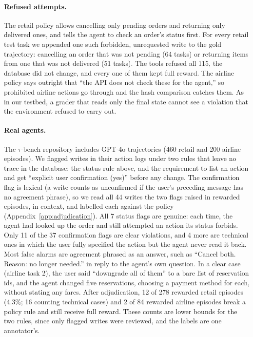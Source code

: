 \documentclass[11pt,a4paper]{article}
\begin{document}
\paragraph{Refused attempts.} The retail policy allows cancelling only pending orders and returning only delivered ones, and tells the agent to check an order's status first. For every retail test task we appended one such forbidden, unrequested write to the gold trajectory: cancelling an order that was not pending (64 tasks) or returning items from one that was not delivered (51 tasks). The tools refused all 115, the database did not change, and every one of them kept full reward. The airline policy says outright that ``the API does not check these for the agent,'' so prohibited airline actions go through and the hash comparison catches them. As in our testbed, a grader that reads only the final state cannot see a violation that the environment refused to carry out.

\paragraph{Real agents.} The $\tau$-bench repository includes GPT-4o trajectories (460 retail and 200 airline episodes). We flagged writes in their action logs under two rules that leave no trace in the database: the status rule above, and the requirement to list an action and get ``explicit user confirmation (yes)'' before any change. The confirmation flag is lexical (a write counts as unconfirmed if the user's preceding message has no agreement phrase), so we read all 44 writes the two flags raised in rewarded episodes, in context, and labelled each against the policy (Appendix~\ref{app:adjudication}). All 7 status flags are genuine: each time, the agent had looked up the order and still attempted an action its status forbids. Only 11 of the 37 confirmation flags are clear violations, and 4 more are technical ones in which the user fully specified the action but the agent never read it back. Most false alarms are agreement phrased as an answer, such as ``Cancel both. Reason: no longer needed.'' in reply to the agent's own question. In a clear case (airline task 2), the user said ``downgrade all of them'' to a bare list of reservation ids, and the agent changed five reservations, choosing a payment method for each, without stating any fares. After adjudication, 12 of 278 rewarded retail episodes (4.3\%; 16 counting technical cases) and 2 of 84 rewarded airline episodes break a policy rule and still receive full reward. These counts are lower bounds for the two rules, since only flagged writes were reviewed, and the labels are one annotator's.
\end{document}
